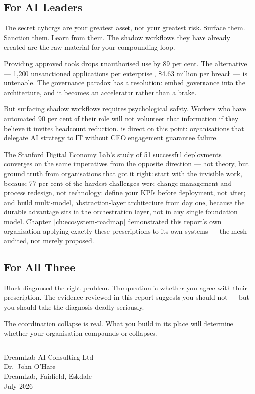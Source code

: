 \subsection{For AI Leaders}

The secret cyborgs are your greatest asset, not your greatest risk. Surface them. Sanction them. Learn from them. The shadow workflows they have already created are the raw material for your compounding loop.

Providing approved tools drops unauthorised use by 89 per cent. The alternative --- 1,200 unsanctioned applications per enterprise \parencite{Gartner2025}, \$4.63 million per breach \parencite{IBM2025} --- is untenable. The governance paradox has a resolution: embed governance into the architecture, and it becomes an accelerator rather than a brake.

But surfacing shadow workflows requires psychological safety. Workers who have automated 90 per cent of their role will not volunteer that information if they believe it invites headcount reduction. \textcite{Mollick2025Management} is direct on this point: organisations that delegate AI strategy to IT without CEO engagement guarantee failure.

The Stanford Digital Economy Lab's study of 51 successful deployments \parencite{Pereira2026Playbook} converges on the same imperatives from the opposite direction --- not theory, but ground truth from organisations that got it right: start with the invisible work, because 77 per cent of the hardest challenges were change management and process redesign, not technology; define your KPIs before deployment, not after; and build multi-model, abstraction-layer architecture from day one, because the durable advantage sits in the orchestration layer, not in any single foundation model. Chapter~\ref{ch:ecosystem-roadmap} demonstrated this report's own organisation applying exactly these prescriptions to its own systems --- the mesh audited, not merely proposed.

\subsection{For All Three}

Block diagnosed the right problem. The question is whether you agree with their prescription. The evidence reviewed in this report suggests you should not --- but you should take the diagnosis deadly seriously.

The coordination collapse is real. What you build in its place will determine whether your organisation compounds or collapses.

\vspace{2cm}

\begin{center}
\textcolor{accentgold}{\rule{0.4\textwidth}{1pt}}

\vspace{0.5cm}

{\small\textcolor{navyblue!70!black}{DreamLab AI Consulting Ltd\\
Dr.\ John O'Hare\\
DreamLab, Fairfield, Eskdale\\
July 2026}}
\end{center}
